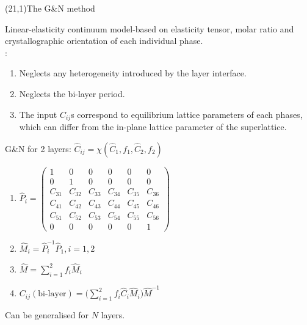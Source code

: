 \documentclass{mul_poster}
\begin{document}
(21,1){The G\&N method}{
  \begin{minipage}{9\TPHorizModule}
    \alert{Linear-elasticity continuum model}-based on \alert{elasticity tensor}, \alert{molar ratio} and \alert{crystallographic orientation} of each individual phase.\medskip\\
%     
    :
    \begin{enumerate}
      \item {\alert{Neglects}} any heterogeneity introduced by the \alert{layer interface}.
      \item \alert{Neglects} the \alert{bi-layer period}.	
      \item The input $C_{ij}$s correspond to equilibrium \alert{lattice parameters} of each phases, which can differ from the in-plane lattice parameter of the superlattice.
    \end{enumerate}
    \vspace{-0.3\TPHorizModule}\mbox{}
  \end{minipage}\hfill
  \begin{minipage}{8.5\TPHorizModule}
    \alert{G\&N for 2 layers}: $\hat C_{ij}=\chi(\hat C_1, f_1, \hat C_2, f_2)$\medskip
    \begin{enumerate}
      \item $\hat P_i=\begin{pmatrix}
            1&0&0&0&0&0\\
            0&1&0&0&0&0\\
            C_{31}&C_{32}&C_{33}&C_{34}&C_{35}&C_{36}\\
            C_{41}&C_{42}&C_{43}&C_{44}&C_{45}&C_{46}\\
            C_{51}&C_{52}&C_{53}&C_{54}&C_{55}&C_{56}\\
            0&0&0&0&0&1
          \end{pmatrix}$
      \item $\hat M_i = \hat P_i^{-1}\hat P_1, i=1,2$
      \item $\hat M=\sum_{i=1}^2f_i\hat M_i$
      \item \alert{$C_{ij}(\text{bi-layer})=\big(\sum_{i=1}^2f_i\hat C_i\hat M_i\big)\hat M^{-1}$}
    \end{enumerate}\medskip
    Can be generalised for $N$ layers.
  \end{minipage}
}
\end{document}
